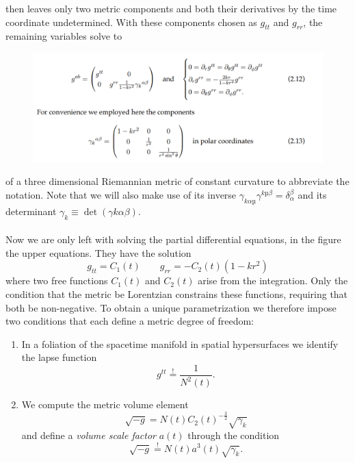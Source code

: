 then leaves only two metric components and both their derivatives by the time coordinate
undetermined. With these components chosen as $g_{tt}$ and $g_{rr}$, the remaining variables
solve to
\begin{figure}[h!]
	\centering
	\includegraphics[width=0.7\linewidth]{gfx/FLRWmetricviaKilling}
	\caption{}
	\label{fig:flrwmetricviakilling}
\end{figure}
of a three dimensional Riemannian metric of constant curvature to abbreviate the notation. Note that we will also make use of its inverse $γ_{kαµ}γ^{k
µβ} = δ^\beta_α$
and its determinant $γ_k ≡ \det (
γ{kαβ})$.\\
\\
Now we are only left with solving the partial differential equations, in the figure the upper equations. They have
the solution
\begin{equation}
	g_{tt}=C_1(t) \qquad g_{rr} = -C_2(t) (1-kr^2)
\end{equation}
where two free functions $C_1(t)$ and $C_2(t)$ arise from the integration. Only the condition that the metric be Lorentzian constrains these functions, requiring that both be non-negative. To obtain a unique parametrization we therefore impose two conditions that
each define a metric degree of freedom:
\begin{enumerate}
	\item In a foliation of the spacetime manifold in spatial hypersurfaces we identify the
	lapse function
	\begin{equation}
		g^{tt} \stackrel{!}{=} \frac{1}{N^2(t)}.
	\end{equation}
	\item We compute the metric volume element
	\begin{equation}
\sqrt{-g} = N(t)C_2(t)^{-\frac{3}{2}}\sqrt{\gamma_k}
	\end{equation}
	and define a \emph{volume scale factor} $a(t)$ through the condition
	\begin{equation}
		\sqrt{-g}\stackrel{!}{=} N(t) a^3(t) \sqrt{\gamma_k}.
	\end{equation}
\end{enumerate}
